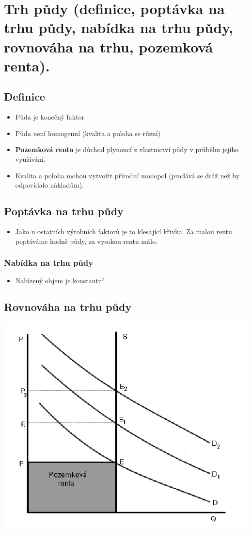 \clearpage
\section{Trh půdy (definice, poptávka na trhu půdy, nabídka na trhu půdy, rovnováha na trhu,
pozemková renta).}

\subsection{Definice}
\begin{itemize}
    \item Půda je konečný faktor
    \item Půda není homogenní (kvalita a poloha se různí)
    \item \textbf{Pozemková renta} je důchod plynoucí z vlastnictví půdy v průběhu jejího využívání.
    \item Kvalita a poloha mohou vytvořit přírodní monopol (prodává se dráž než by odpovídalo nákladům).
\end{itemize}

\subsection{Poptávka na trhu půdy}
\begin{itemize}
    \item Jako u ostatních výrobních faktorů je to klesající křivka. Za malou rentu poptáváme hodně půdy,
    za vysokou rentu málo.
\end{itemize}

\subsubsection{Nabídka na trhu půdy}
\begin{itemize}
    \item Nabízený objem je konstantní.
\end{itemize}

\subsection{Rovnováha na trhu půdy}
\includegraphics[]{images/19_rovnovaha.png}

